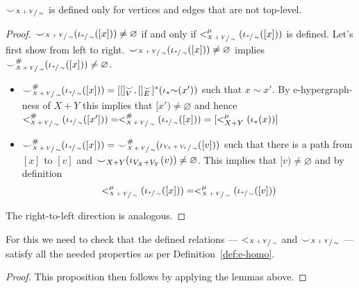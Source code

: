 \begin{lemma}
\label{lemma:consistency_child}
    ${\smile}_{\sfrac{X+Y}{\sim}}$ is defined only for vertices and edges that are not top-level.
\end{lemma}
\begin{proof}
  ${\smile}_{\sfrac{X+Y}{\sim}}(\iota_{\sfrac{*}{\sim}}([x])) \not = \varnothing$ if and only if $<_{\sfrac{X+Y}{\sim}}^{\mu}(\iota_{\sfrac{*}{\sim}}([x]))$ is defined.
  Let's first show from left to right. ${\smile}_{\sfrac{X+Y}{\sim}}(\iota_{\sfrac{*}{\sim}}([x])) \not = \varnothing$ implies ${\smile}_{\sfrac{X+Y}{\sim}}^{{\#}}(\iota_{\sfrac{*}{\sim}}([x])) \not = \varnothing$.
  \begin{itemize}
    \item ${\smile}_{\sfrac{X+Y}{\sim}}^{{\#}}(\iota_{\sfrac{*}{\sim}}([x])) = [[]_{V}^{{\smile}},[]_{E}^{{\smile}}]^{*}(\iota_{*}{\sim}(x'))$ such that $x \sim x'$.
          By e-hypergraph-ness of $X+Y$ this implies that $[x') \not = \varnothing$ and hence $<_{\sfrac{X+Y}{\sim}}^{{\#}}(\iota_{\sfrac{*}{\sim}}([x'])) = <_{\sfrac{X+Y}{\sim}}^{{\#}}(\iota_{\sfrac{*}{\sim}}([x])) = [<_{X+Y}^{\mu}(\iota_{*}(x))]$
    \item ${\smile}_{\sfrac{X+Y}{\sim}}^{{\#}}(\iota_{\sfrac{*}{\sim}}([x])) = {\smile}_{\sfrac{X+Y}{\sim}}^{{\#}}(\iota_{\sfrac{V_{X} + V_{Y}}{\sim}}([v]))$ such that there is a path from $[x]$ to $[v]$ and
          ${\smile}_{X+Y}(\iota_{V_{X} + V_{Y}}(v)) \not = \varnothing$. This implies that $[v) \not = \varnothing$ and by definition
          \[
            <_{\sfrac{X+Y}{\sim}}^{\mu}(\iota_{\sfrac{*}{\sim}}([x])) = <_{\sfrac{X+Y}{\sim}}^{\mu}(\iota_{\sfrac{*}{\sim}}([v]))  
          \]
  \end{itemize}
  The right-to-left direction is analogous.
\end{proof}


\begin{proposition}
\label{prop:pushout_is_e_hypergraph}
For this we need to check that the defined relations --- $<_{\sfrac{X+Y}{\sim}}$ and ${\smile}_{\sfrac{X+Y}{\sim}}$ --- satisfy all the needed properties as per Definition~\ref{def:e-homo}.
\end{proposition}
\begin{proof}
    This proposition then follows by applying the lemmas above.
\end{proof}

